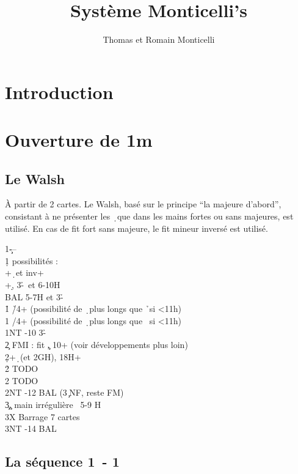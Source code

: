 \documentclass[a4paper]{article}
\title{Système Monticelli's}
\author{Thomas et Romain Monticelli}
\begin{document}
\maketitle
\tableofcontents

\section{Introduction}

\section{Ouverture de 1m}

\subsection{Le Walsh}

À partir de 2 cartes. Le Walsh, basé sur le principe ``la majeure d'abord'', consistant à ne présenter les \d\ que dans les mains fortes ou sans majeures, est utilisé.
En cas de fit fort sans majeure, le fit mineur inversé est utilisé.

\begin{bidtable}
1\c---\\
1\d {} possibilités :\\
+\d\ et inv+\\
+\d , 3-\h \s\ et 6-10H\\
\>BAL 5-7H et 3-\h \s \\
1\h \> \h /4+ (possibilité de \d\ plus longs que \h\ si <11h)\\
1\s \> \s /4+ (possibilité de \d\ plus longs que \s\ si <11h)\\
1NT -10 3-\h \s \\
2\c \> FMI : fit \c , 10+ (voir développements plus loin)\\
2\d {}+\d\ (et 2GH), 18H+\\
2\h \> TODO\\
2\s \> TODO\\
2NT	 -12 BAL (3\c\ NF, reste FM)\\
3\c	 {}\c , main irrégulière ~5-9 H\\
3X	 \> Barrage 7 cartes\\
3NT	 -14 BAL
\end{bidtable}

\subsection{La séquence 1\pdfc\ - 1\pdfd}
\end{document}
